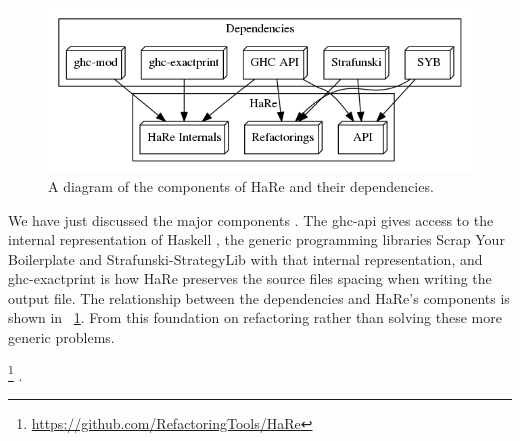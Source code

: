 \DIFdelbegin %
\DIFdelendFL \DIFaddbeginFL \begin{figure}[t]
	\DIFaddendFL \begin{center}
		\includegraphics[scale=.4]{graphVis/Chapter2/hareDesign.png}
	\end{center}
	\caption{A diagram of the components of HaRe and their dependencies.}
	\label{design}
\end{figure}

We have just discussed the major components \DIFdelbegin {}\DIFdelend \DIFaddbegin {}\DIFaddend . The ghc-api gives \DIFdelbegin {}\DIFdelend access to the internal representation of Haskell \DIFaddbegin {}\DIFaddend , the generic programming libraries Scrap Your Boilerplate and Strafunski-StrategyLib \DIFdelbegin {}\DIFdelend \DIFaddbegin {}\DIFaddend with that internal representation, and ghc-exactprint is how HaRe preserves the source files spacing when writing the output file. The relationship between the dependencies and HaRe's components is shown in \DIFdelbegin {}\DIFdelend \DIFaddbegin {}\DIFaddend ~\ref{design}. From this foundation \DIFdelbegin {}\DIFdelend \DIFaddbegin {}\DIFaddend on refactoring rather than solving these more generic problems.
\DIFdelbegin {}\DIFdelend \DIFaddbegin 

\footnote{\url{https://github.com/RefactoringTools/HaRe}} \DIFaddend .

